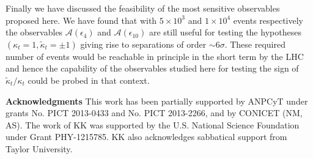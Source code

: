 \documentclass[aps,preprint,tightenlines,floatfix,superscriptaddress,nofootinbib,showpacs]{revtex4-1}
\def\kp{\kappa_t}
\def\kpt{\tilde{\kappa}_t}
\begin{document}
Finally we have discussed the feasibility of the most sensitive
observables proposed here. We have found that with $5\times 10^3$ and
$1\times 10^4$ events respectively the observables
$\mathcal{A}(\epsilon_4)$ and $\mathcal{A}(\epsilon_{10})$ are still
useful for testing the hypotheses $(\kp=1,\kpt=\pm 1)$ giving rise to
separations of order $\sim 6\sigma$. These required number of events
would be reachable in principle in the short term by the LHC and hence
the capability of the observables studied here for testing the sign of
$\kpt/\kp$ could be probed in that context.

\bigskip
\noindent
{\bf Acknowledgments}
\noindent 
This work has been partially supported by ANPCyT under grants No. PICT
2013-0433 and No. PICT 2013-2266, and by CONICET (NM, AS). The work of
KK was supported by the U.S.  National Science Foundation under Grant
PHY-1215785. KK also acknowledges sabbatical support from Taylor
University.
\section*{\refname}
\let\bibsection\relax

\setlength{\bibsep}{10pt}


\end{document}
